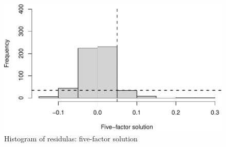 \documentclass[
  english,
  man]{apa6}
\begin{document}
\begin{appendix}
\begin{figure}
\centering
\includegraphics{manuscript_files/figure-latex/EFAResidualsAppB-1.pdf}
\caption{\label{fig:EFAResidualsAppB} Histogram of residulas: five-factor
solution}
\end{figure}
\end{appendix}

\clearpage
\makeatletter
\efloat@restorefloats
\makeatother
\end{document}
